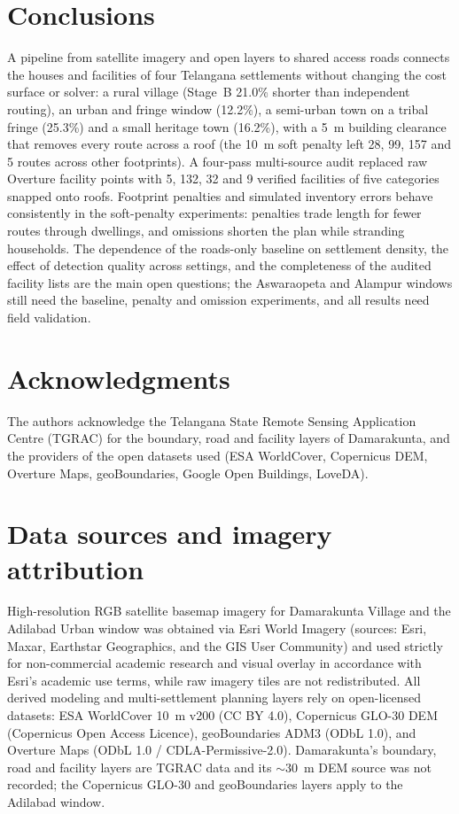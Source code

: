 \documentclass[12pt,a4paper]{article}
\newif\ifanon
\begin{document}
\section{Conclusions}
A pipeline from satellite imagery and open layers to shared access roads connects the houses and facilities of four Telangana settlements without changing the cost surface or solver: a rural village (Stage~B 21.0\% shorter than independent routing), an urban and fringe window (12.2\%), a semi-urban town on a tribal fringe (25.3\%) and a small heritage town (16.2\%), with a 5~m building clearance that removes every route across a roof (the 10~m soft penalty left 28, 99, 157 and 5 routes across other footprints). A four-pass multi-source audit replaced raw Overture facility points with 5, 132, 32 and 9 verified facilities of five categories snapped onto roofs. Footprint penalties and simulated inventory errors behave consistently in the soft-penalty experiments: penalties trade length for fewer routes through dwellings, and omissions shorten the plan while stranding households. The dependence of the roads-only baseline on settlement density, the effect of detection quality across settings, and the completeness of the audited facility lists are the main open questions; the Aswaraopeta and Alampur windows still need the baseline, penalty and omission experiments, and all results need field validation.

\ifanon\else
\section*{Acknowledgments}
The authors acknowledge the Telangana State Remote Sensing Application Centre (TGRAC) for the boundary, road and facility layers of Damarakunta, and the providers of the open datasets used (ESA WorldCover, Copernicus DEM, Overture Maps, geoBoundaries, Google Open Buildings, LoveDA).
\fi

\section*{Data sources and imagery attribution}
High-resolution RGB satellite basemap imagery for Damarakunta Village and the Adilabad Urban window was obtained via Esri World Imagery (sources: Esri, Maxar, Earthstar Geographics, and the GIS User Community) and used strictly for non-commercial academic research and visual overlay in accordance with Esri's academic use terms, while raw imagery tiles are not redistributed. All derived modeling and multi-settlement planning layers rely on open-licensed datasets: ESA WorldCover 10~m v200 (CC BY 4.0), Copernicus GLO-30 DEM (Copernicus Open Access Licence), geoBoundaries ADM3 (ODbL 1.0), and Overture Maps (ODbL 1.0 / CDLA-Permissive-2.0). Damarakunta's boundary, road and facility layers are TGRAC data and its $\sim$30~m DEM source was not recorded; the Copernicus GLO-30 and geoBoundaries layers apply to the Adilabad window.
\end{document}
